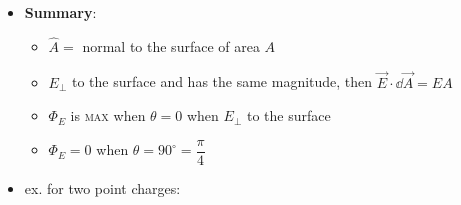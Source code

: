 \documentclass{article}
\begin{document}
\begin{itemize}
\begin{itemize}
\begin{center}
          \end{center}
      \end{itemize}
      \item \textbf{Summary}:
        \begin{itemize}
          \item $\hat{A}=$ normal to the surface of area $A$
          \item $E_\perp$ to the surface and has the same magnitude, then $\vec{E}\cdot \dd{\vec{A}=EA}$
          \item $\Phi_E$ is \textsc{max} when $\theta=0$ when $E_\perp$ to the surface
          \item $\Phi_E=0$ when $\theta=90^\circ=\dfrac{\pi}{4}$
        \end{itemize}
      \item ex. for two point charges:
      \begin{center}
        \begin{tikzpicture}[x=0.75pt,y=0.75pt,yscale=-.8,xscale=.8]
          

\end{tikzpicture}
\end{center}
\end{itemize}
\end{document}
